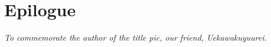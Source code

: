 \documentclass[12pt,a4paper]{article}
\begin{document}
    \section{Epilogue}\label{sec:end}
    

    \clearpage

    \thispagestyle{empty}
    \vspace*{\fill}
    \begin{center}
        \textit{To commemorate the author of the title pic, our friend, Uekawakuyuurei.}
    \end{center}
    \vspace*{\fill}
    \clearpage

    
    
\end{document}
